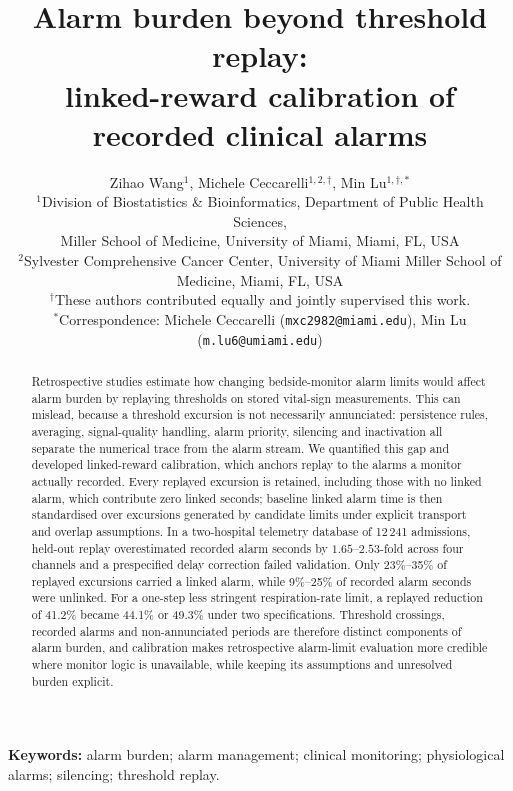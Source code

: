 \documentclass[11pt,letterpaper]{article}
\title{\bfseries Alarm burden beyond threshold replay:\\linked-reward calibration of recorded clinical alarms}
\author{
Zihao Wang$^{1}$, Michele Ceccarelli$^{1,2,\dagger}$, Min Lu$^{1,\dagger,\ast}$\\[2pt]
\small $^{1}$Division of Biostatistics \& Bioinformatics, Department of Public Health Sciences,\\
\small Miller School of Medicine, University of Miami, Miami, FL, USA\\
\small $^{2}$Sylvester Comprehensive Cancer Center, University of Miami Miller School of Medicine,
Miami, FL, USA\\[2pt]
\small $^{\dagger}$These authors contributed equally and jointly supervised this work.\\
\small $^{\ast}$Correspondence:
Michele Ceccarelli (\texttt{mxc2982@miami.edu}),
Min Lu (\texttt{m.lu6@umiami.edu})
}
\date{}
\begin{document}
\maketitle
\begin{abstract}\noindent
Retrospective studies estimate how changing bedside-monitor alarm limits would affect alarm burden by replaying thresholds on stored vital-sign measurements. This can mislead, because a threshold excursion is not necessarily annunciated: persistence rules, averaging, signal-quality handling, alarm priority, silencing and inactivation all separate the numerical trace from the alarm stream. We quantified this gap and developed linked-reward calibration, which anchors replay to the alarms a monitor actually recorded. Every replayed excursion is retained, including those with no linked alarm, which contribute zero linked seconds; baseline linked alarm time is then standardised over excursions generated by candidate limits under explicit transport and overlap assumptions. In a two-hospital telemetry database of 12\,241 admissions, held-out replay overestimated recorded alarm seconds by $1.65$--$2.53$-fold across four channels and a prespecified delay correction failed validation. Only 23\%--35\% of replayed excursions carried a linked alarm, while 9\%--25\% of recorded alarm seconds were unlinked. For a one-step less stringent respiration-rate limit, a replayed reduction of 41.2\% became 44.1\% or 49.3\% under two specifications. Threshold crossings, recorded alarms and non-annunciated periods are therefore distinct components of alarm burden, and calibration makes retrospective alarm-limit evaluation more credible where monitor logic is unavailable, while keeping its assumptions and unresolved burden explicit.

\end{abstract}
\noindent\textbf{Keywords:} alarm burden; alarm management; clinical monitoring; physiological alarms; silencing; threshold replay.
\end{document}

